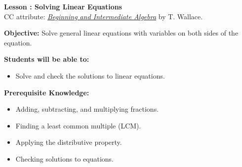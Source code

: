 \documentclass[12pt]{article}
\theoremstyle{definition}
\begin{document}
{\bf \large Lesson : Solving Linear Equations}\label{les:solving_linear_equations}\\
CC attribute: \href{http://www.wallace.ccfaculty.org/book/book.html}{\it{Beginning and Intermediate Algebra}} by T. Wallace. \hfill \doclicenseImage[imagewidth=5em]\\
\par
{\bf Objective:} Solve general linear equations with variables on both sides of the equation. \\
\par
{\bf Students will be able to:}
\begin{itemize}
	\item Solve and check the solutions to linear equations.
\end{itemize}
{\bf Prerequisite Knowledge:}
\begin{itemize}
	\item Adding, subtracting, and multiplying fractions.
	\item Finding a least common multiple (LCM).
	\item Applying the distributive property.
	\item Checking solutions to equations.
\end{itemize}
\hrulefill
\end{document}
